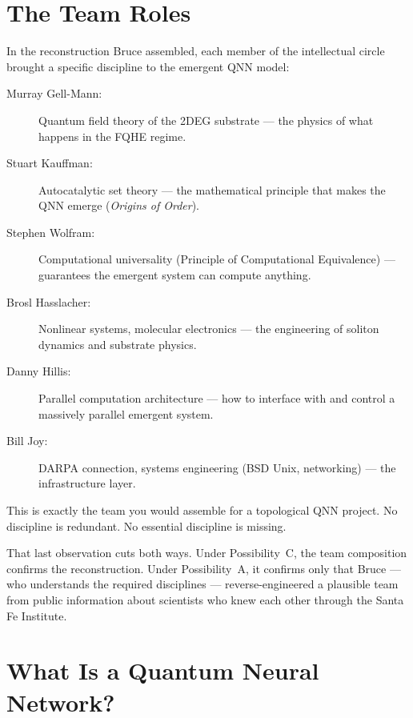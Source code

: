 \section*{The Team Roles}
\label{pos21:the-team-roles}


In the reconstruction Bruce assembled, each member of the intellectual circle brought a specific discipline to the emergent QNN model:

\begin{description}
\item[Murray Gell-Mann:] Quantum field theory of the 2DEG substrate --- the physics of what happens in the FQHE regime.
\item[Stuart Kauffman:] Autocatalytic set theory --- the mathematical principle that makes the QNN emerge (\textit{Origins of Order}).
\item[Stephen Wolfram:] Computational universality (Principle of Computational Equivalence) --- guarantees the emergent system can compute anything.
\item[Brosl Hasslacher:] Nonlinear systems, molecular electronics --- the engineering of soliton dynamics and substrate physics.
\item[Danny Hillis:] Parallel computation architecture --- how to interface with and control a massively parallel emergent system.
\item[Bill Joy:] DARPA connection, systems engineering (BSD Unix, networking) --- the infrastructure layer.
\end{description}

This is exactly the team you would assemble for a topological QNN project. No discipline is redundant. No essential discipline is missing.

That last observation cuts both ways. Under Possibility~C, the team composition confirms the reconstruction. Under Possibility~A, it confirms only that Bruce --- who understands the required disciplines --- reverse-engineered a plausible team from public information about scientists who knew each other through the Santa Fe Institute.

\section*{What Is a Quantum Neural Network?}
\label{pos21:what-is-a-quantum-neural-network}


